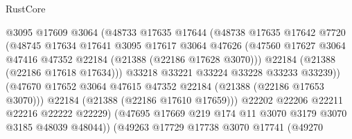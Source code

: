 \begin{lexlean}{RustCore}
\begin{coremodule}
                                    @3095
                                    @17609
                                    @3064
                                    (@48733
                                      @17635
                                      @17644
                                      (@48738
                                        @17635
                                        @17642
                                        @7720
                                        (@48745
                                          @17634
                                          @17641
                                          @3095
                                          @17617
                                          @3064
                                          @47626
                                          (@47560
                                            @17627
                                            @3064
                                            @47416
                                            @47352
                                            @22184
                                            (@21388 (@22186 @17628 @3070)))
                                          @22184
                                          (@21388 (@22186 @17618 @17634)))
                                        @33218
                                        @33221
                                        @33224
                                        @33228
                                        @33233
                                        @33239))
                                    (@47670
                                      @17652
                                      @3064
                                      @47615
                                      @47352
                                      @22184
                                      (@21388 (@22186 @17653 @3070)))
                                    @22184
                                    (@21388 (@22186 @17610 @17659)))
                                  @22202
                                  @22206
                                  @22211
                                  @22216
                                  @22222
                                  @22229)
                                (@47695 @17669 @219 @174 @11 @3070 @3179 @3070 @3185 @48039 @48044))
                              (@49263
                                @17729
                                @17738
                                @3070
                                @17741
                                (@49270

\end{coremodule}
\end{lexlean}
